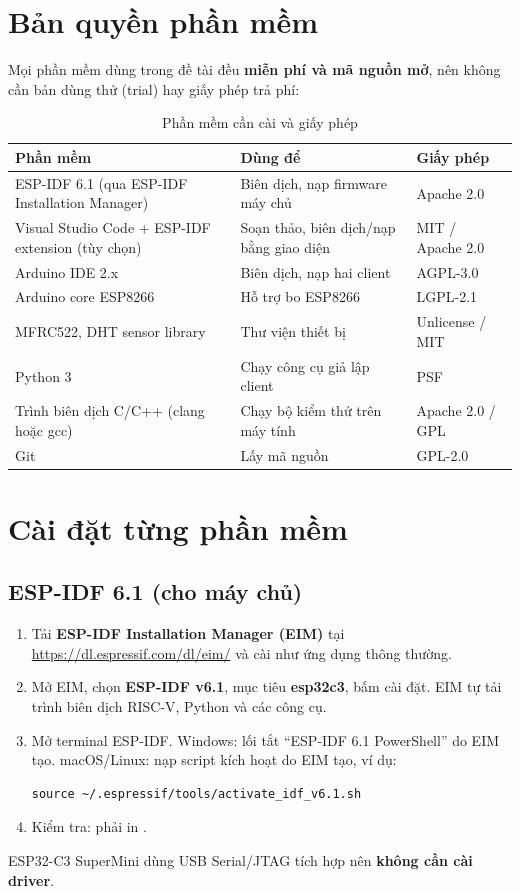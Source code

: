 \section{Bản quyền phần mềm}
Mọi phần mềm dùng trong đề tài đều \textbf{miễn phí và mã nguồn mở}, nên không cần
bản dùng thử (trial) hay giấy phép trả phí:
\begin{table}[H]
\centering\small
\caption{Phần mềm cần cài và giấy phép}\label{tab:licenses}
\begin{tabularx}{\linewidth}{@{}lXl@{}}
\toprule
\textbf{Phần mềm} & \textbf{Dùng để} & \textbf{Giấy phép} \\ \midrule
ESP-IDF 6.1 (qua ESP-IDF Installation Manager) & Biên dịch, nạp firmware máy chủ & Apache 2.0 \\
Visual Studio Code + ESP-IDF extension (tùy chọn) & Soạn thảo, biên dịch/nạp bằng giao diện & MIT / Apache 2.0 \\
Arduino IDE 2.x & Biên dịch, nạp hai client & AGPL-3.0 \\
Arduino core ESP8266 & Hỗ trợ bo ESP8266 & LGPL-2.1 \\
MFRC522, DHT sensor library & Thư viện thiết bị & Unlicense / MIT \\
Python 3 & Chạy công cụ giả lập client & PSF \\
Trình biên dịch C/C++ (clang hoặc gcc) & Chạy bộ kiểm thử trên máy tính & Apache 2.0 / GPL \\
Git & Lấy mã nguồn & GPL-2.0 \\
\bottomrule
\end{tabularx}
\end{table}

\section{Cài đặt từng phần mềm}
\subsection{ESP-IDF 6.1 (cho máy chủ)}
\begin{enumerate}
  \item Tải \textbf{ESP-IDF Installation Manager (EIM)} tại
        \url{https://dl.espressif.com/dl/eim/} và cài như ứng dụng thông thường.
  \item Mở EIM, chọn \textbf{ESP-IDF v6.1}, mục tiêu \textbf{esp32c3}, bấm cài đặt.
        EIM tự tải trình biên dịch RISC-V, Python và các công cụ.
  \item Mở terminal ESP-IDF. Windows: lối tắt ``ESP-IDF 6.1 PowerShell'' do EIM tạo.
        macOS/Linux: nạp script kích hoạt do EIM tạo, ví dụ:
\begin{lstlisting}[style=shell]
source ~/.espressif/tools/activate_idf_v6.1.sh
\end{lstlisting}
  \item Kiểm tra:  phải in .
\end{enumerate}
ESP32-C3 SuperMini dùng USB Serial/JTAG tích hợp nên \textbf{không cần cài driver}.

